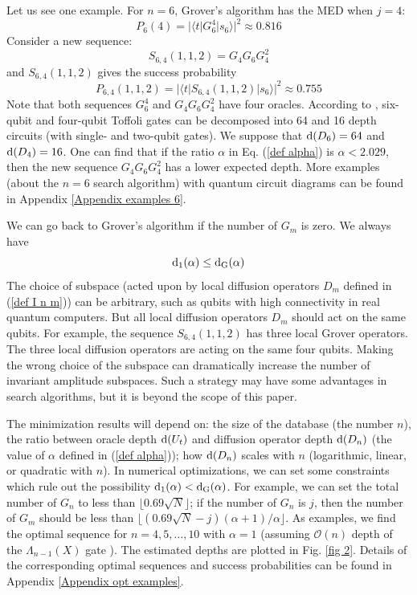 \documentclass[%
 twocolumn,
 10pt,
 superscriptaddress,
 longbibliography,
 amsmath,amssymb,
 aps,
 pra,
floatfix,
]{revtex4-1}
\begin{document}
Let us see one example. For $n=6$, Grover's algorithm has the MED when $j=4$:
\begin{equation}
	P_6(4) = |\langle t|G_6^4|s_6\rangle|^2\approx 0.816
\end{equation}
Consider a new sequence:
\begin{equation}
	S_{6,4}(1,1,2) = G_4G_6G_4^2
\end{equation}
and $S_{6,4}(1,1,2)$ gives the success probability
\begin{equation}
	P_{6,4}(1,1,2) = |\langle t|S_{6,4}(1,1,2)|s_6\rangle|^2\approx 0.755
\end{equation}
Note that both sequences $G_6^4$ and $G_4G_6G_4^2$ have four oracles. According to \cite{BBCDMSSSW95}, six-qubit and four-qubit Toffoli gates can be decomposed into 64 and 16 depth circuits (with single- and two-qubit gates). We suppose that $\text d(D_6)=64$ and $\text d(D_4)=16$. One can find that if the ratio $\alpha$ in Eq. (\ref{def alpha}) is $\alpha<2.029$, then the new sequence $G_4G_6G_4^2$ has a lower expected depth. More examples (about the $n=6$ search algorithm) with quantum circuit diagrams can be found in Appendix \ref{Appendix examples 6}.

We can go back to Grover's algorithm if the number of $G_m$ is zero. We always have
\begin{equation}
	\text d_1(\alpha)\leq\text d_\text{G}(\alpha)
\end{equation}
The choice of subspace (acted upon by local diffusion operators $D_m$ defined in (\ref{def I n m})) can be arbitrary, such as qubits with high connectivity in real quantum computers. But all local diffusion operators $D_m$ should act on the same qubits. For example, the sequence $S_{6,4}(1,1,2)$ has three local Grover operators. The three local diffusion operators are acting on the same four qubits. Making the wrong choice of the subspace can dramatically increase the number of invariant amplitude subspaces. Such a strategy may have some advantages in search algorithms, but it is beyond the scope of this paper.

The minimization results will depend on: the size of the database (the number $n$), the ratio between oracle depth $\text d(U_t)$ and diffusion operator depth $\text d(D_n)$ (the value of $\alpha$ defined in (\ref{def alpha})); how $\text d(D_n)$ scales with $n$ (logarithmic, linear, or quadratic with $n$). In numerical optimizations, we can set some constraints which rule out the possibility $\text d_1(\alpha)<\text d_\text{G}(\alpha)$. For example, we can set the total number of $G_n$ to less than $\lfloor0.69\sqrt N\rfloor$; if the number of $G_n$ is $j$, then the number of $G_m$ should be less than $\lfloor(0.69\sqrt N-j)(\alpha+1)/\alpha\rfloor$. As examples, we find the optimal sequence for $n=4,5,\ldots,10$ with $\alpha=1$ (assuming $\mathcal O(n)$ depth of the $\Lambda_{n-1}(X)$ gate \cite{BBCDMSSSW95}). The estimated depths are plotted in Fig. \ref{fig 2}. Details of the corresponding optimal sequences and success probabilities can be found  in Appendix \ref{Appendix opt examples}.
\end{document}

